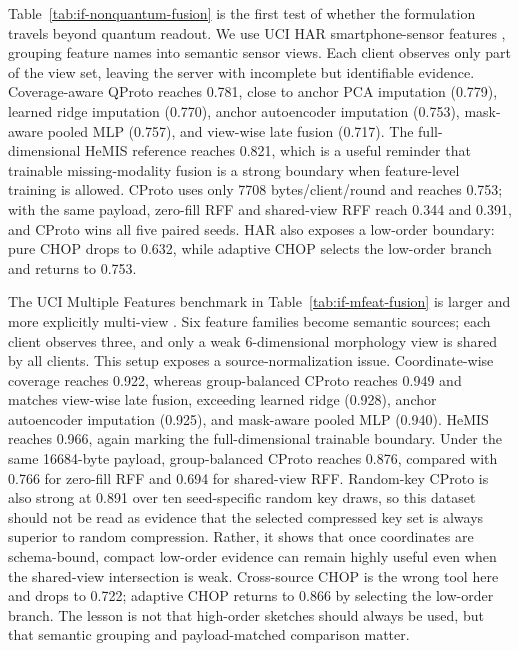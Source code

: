 

Table~\ref{tab:if-nonquantum-fusion} is the first test of whether the formulation travels beyond quantum readout. We use UCI HAR smartphone-sensor features \cite{anguita2013har}, grouping feature names into semantic sensor views. Each client observes only part of the view set, leaving the server with incomplete but identifiable evidence. Coverage-aware QProto reaches 0.781, close to anchor PCA imputation (0.779), learned ridge imputation (0.770), anchor autoencoder imputation (0.753), mask-aware pooled MLP (0.757), and view-wise late fusion (0.717). The full-dimensional HeMIS reference reaches 0.821, which is a useful reminder that trainable missing-modality fusion is a strong boundary when feature-level training is allowed. CProto uses only 7708 bytes/client/round and reaches 0.753; with the same payload, zero-fill RFF and shared-view RFF reach 0.344 and 0.391, and CProto wins all five paired seeds. HAR also exposes a low-order boundary: pure CHOP drops to 0.632, while adaptive CHOP selects the low-order branch and returns to 0.753.



The UCI Multiple Features benchmark in Table~\ref{tab:if-mfeat-fusion} is larger and more explicitly multi-view \cite{uci_mfeat}. Six feature families become semantic sources; each client observes three, and only a weak 6-dimensional morphology view is shared by all clients. This setup exposes a source-normalization issue. Coordinate-wise coverage reaches 0.922, whereas group-balanced CProto reaches 0.949 and matches view-wise late fusion, exceeding learned ridge (0.928), anchor autoencoder imputation (0.925), and mask-aware pooled MLP (0.940). HeMIS reaches 0.966, again marking the full-dimensional trainable boundary. Under the same 16684-byte payload, group-balanced CProto reaches 0.876, compared with 0.766 for zero-fill RFF and 0.694 for shared-view RFF. Random-key CProto is also strong at 0.891 over ten seed-specific random key draws, so this dataset should not be read as evidence that the selected compressed key set is always superior to random compression. Rather, it shows that once coordinates are schema-bound, compact low-order evidence can remain highly useful even when the shared-view intersection is weak. Cross-source CHOP is the wrong tool here and drops to 0.722; adaptive CHOP returns to 0.866 by selecting the low-order branch. The lesson is not that high-order sketches should always be used, but that semantic grouping and payload-matched comparison matter.

